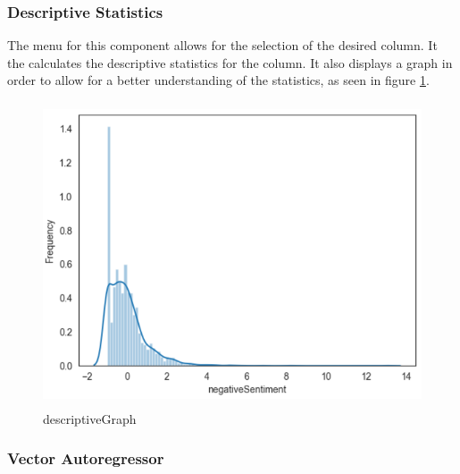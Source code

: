 \subsubsection{Descriptive Statistics}

The menu for this component allows for the selection of the desired column. It the calculates the descriptive statistics for the column. It also displays a graph in order to allow for a better understanding of the statistics, as seen in figure \ref{fig:descriptiveGraph}.

\begin{figure}[h!]
    \centering
    \includegraphics[width=15cm,height=9cm,keepaspectratio]{implementation/descriptiveGraph.png}
    \caption{descriptiveGraph}
    \label{fig:descriptiveGraph}
\end{figure}

\subsubsection{Vector Autoregressor}

